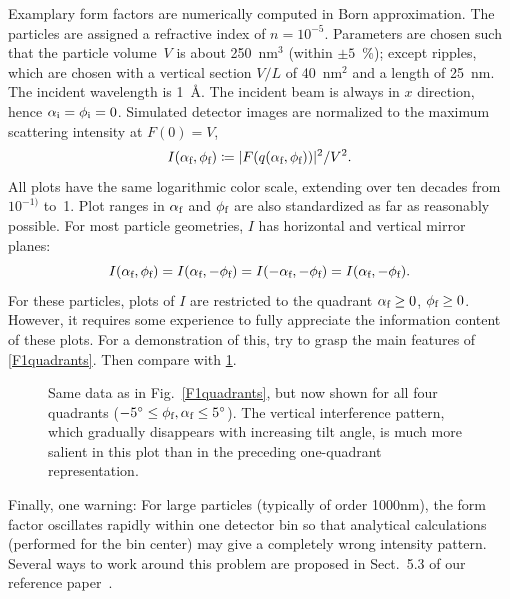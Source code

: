Examplary form factors are numerically computed in Born approximation.
The particles are assigned a refractive index of $n=10^{-5}$.
Parameters are chosen such that
the particle volume~$V$ is about 250~nm$^3$ (within $\pm5$~\%);
except ripples, which are chosen with a vertical section $V/L$ of 40~nm$^2$
and a length of 25~nm.
The incident wavelength is 1~\AA.
The incident beam is always in $x$ direction, hence $\alpha_\si=\phi_\si=0$.
Simulated detector images are normalized to the maximum scattering intensity at $F(0)=V$,
\begin{equation}
  I(\alpha_\sf,\phi_\sf)\coloneqq |F(q(\alpha_\sf,\phi_\sf))|^2/V^2.
\end{equation}
All plots have the same logarithmic color scale,
extending over ten decades from $10^{-1)}$ to~1.
Plot ranges in $\alpha_\sf$ and $\phi_\sf$ are also standardized as far as
reasonably possible.
For most particle geometries,
$I$ has horizontal and vertical mirror planes:
\begin{equation}\label{EFq4sym}
  I(\alpha_\sf,\phi_\sf)
  = I(\alpha_\sf,-\phi_\sf)
  = I(-\alpha_\sf,-\phi_\sf)
  = I(\alpha_\sf,-\phi_\sf).
\end{equation}
For these particles,
plots of $I$ are restricted to the quadrant $\alpha_\sf\ge0$, $\phi_\sf\ge0$.
However, it requires some experience to fully appreciate the
information content of these plots.
For a demonstration of this,
try to grasp the main features of \cref{F1quadrants}.
Then compare with \cref{F4quadrants}.

\begin{figure}[t]
\begin{center}
\end{center}
\caption{Same data as in Fig.~\protect\ref{F1quadrants},
but now shown for all four quadrants ($-5^\circ\le\phi_\sf,\alpha_\sf\le 5^\circ$).
The vertical interference pattern,
which gradually disappears with increasing tilt angle,
 is much more salient in this plot
than in the preceding one-quadrant representation.}
\label{F4quadrants}
\end{figure}

%
%
%
%
%
%
%
Finally, one warning: For large particles (typically of order 1000nm),
  the form factor oscillates rapidly within one detector bin
  so that analytical calculations (performed for the bin center)
  may give a completely wrong intensity pattern.
Several ways to work around this problem are proposed in Sect.~5.3
of our reference paper~\cite{PoHB20}.

